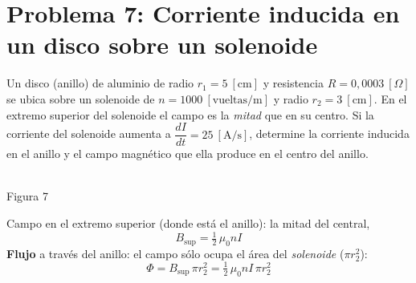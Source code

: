 \documentclass[12pt,letterpaper]{article}
\begin{document}
\vspace{0.5cm}

\section*{Problema 7: Corriente inducida en un disco sobre un solenoide}

\noindent Un disco (anillo) de aluminio de radio $r_1 = 5\ [\text{cm}]$ y resistencia
$R = 0{,}0003\ [\Omega]$ se ubica sobre un solenoide de $n = 1000\ [\text{vueltas/m}]$ y radio
$r_2 = 3\ [\text{cm}]$. En el extremo superior del solenoide el campo es la \emph{mitad} que en su
centro. Si la corriente del solenoide aumenta a $\dfrac{dI}{dt} = 25\ [\text{A/s}]$, determine la
corriente inducida en el anillo y el campo magn\'etico que ella produce en el centro del anillo.

\medskip

\noindent
\begin{minipage}[t]{0.32\textwidth}
\centering\vspace{0pt}
\\[2pt]
{\footnotesize Figura 7}
\end{minipage}%
\hfill
\begin{minipage}[t]{0.65\textwidth}
\vspace{0pt}
Campo en el extremo superior (donde est\'a el anillo): la mitad del central,
\[
    B_{\text{sup}} = \tfrac{1}{2}\,\mu_0 n I
\]
\textbf{Flujo} a trav\'es del anillo: el campo s\'olo ocupa el \'area del \emph{solenoide}
($\pi r_2^2$):
\[
    \Phi = B_{\text{sup}}\,\pi r_2^2 = \tfrac{1}{2}\,\mu_0 n I\,\pi r_2^2
\]
\end{minipage}
\end{document}
